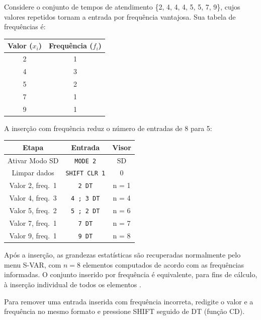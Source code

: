 Considere o conjunto de tempos de atendimento \{2, 4, 4, 4, 5, 5, 7, 9\}, cujos valores repetidos tornam a entrada por frequência vantajosa. Sua tabela de frequências é:

\begin{table}[H]
    \centering
    \begin{tabular}{|c|c|}
        \hline
        \textbf{Valor} ($x_i$) & \textbf{Frequência} ($f_i$) \\ \hline
        2 & 1 \\
        4 & 3 \\
        5 & 2 \\
        7 & 1 \\
        9 & 1 \\ \hline
    \end{tabular}
\end{table}

A inserção com frequência reduz o número de entradas de 8 para 5:

\begin{table}[H]
    \centering
    \begin{tabular}{|c|c|c|}
        \hline
        \textbf{Etapa} & \textbf{Entrada} & \textbf{Visor} \\ \hline
        Ativar Modo SD & \texttt{MODE 2} & SD    \\
        Limpar dados & \texttt{SHIFT CLR 1} & 0     \\
        Valor 2, freq.\ 1 & \texttt{2 DT} & n = 1 \\
        Valor 4, freq.\ 3 & \texttt{4 ; 3 DT} & n = 4 \\
        Valor 5, freq.\ 2 & \texttt{5 ; 2 DT} & n = 6 \\
        Valor 7, freq.\ 1 & \texttt{7 DT} & n = 7 \\
        Valor 9, freq.\ 1 & \texttt{9 DT} & n = 8 \\ \hline
    \end{tabular}
\end{table}

Após a inserção, as grandezas estatísticas são recuperadas normalmente pelo menu S-VAR, com $n = 8$ elementos computados de acordo com as frequências informadas. O conjunto inserido por frequência é equivalente, para fins de cálculo, à inserção individual de todos os elementos \cite{casio2004}.

Para remover uma entrada inserida com frequência incorreta, redigite o valor e a frequência no mesmo formato e pressione SHIFT seguido de DT (função CD).

